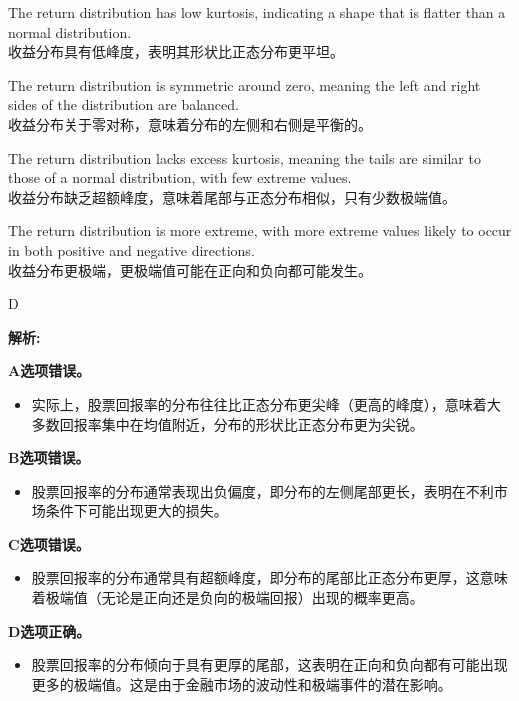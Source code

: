 \documentclass{article}
\newenvironment{explanation}
{\textbf{解析:}\par}
{\par}
\begin{document}
\begin{choices}
    \item The return distribution has low kurtosis, indicating a shape that is flatter than a normal distribution.\\
    收益分布具有低峰度，表明其形状比正态分布更平坦。
    \item The return distribution is symmetric around zero, meaning the left and right sides of the distribution are balanced.\\
    收益分布关于零对称，意味着分布的左侧和右侧是平衡的。
    \item The return distribution lacks excess kurtosis, meaning the tails are similar to those of a normal distribution, with few extreme values.\\
    收益分布缺乏超额峰度，意味着尾部与正态分布相似，只有少数极端值。
    \item The return distribution is more extreme, with more extreme values likely to occur in both positive and negative directions.\\
    收益分布更极端，更极端值可能在正向和负向都可能发生。
\end{choices}

\begin{correctanswer}
    D
\end{correctanswer}

\begin{explanation}
    \textbf{A选项错误。}
    \begin{itemize}
        \item 实际上，股票回报率的分布往往比正态分布更尖峰（更高的峰度），意味着大多数回报率集中在均值附近，分布的形状比正态分布更为尖锐。
    \end{itemize}

    \textbf{B选项错误。}
    \begin{itemize}
        \item 股票回报率的分布通常表现出负偏度，即分布的左侧尾部更长，表明在不利市场条件下可能出现更大的损失。
    \end{itemize}

    \textbf{C选项错误。}
    \begin{itemize}
        \item 股票回报率的分布通常具有超额峰度，即分布的尾部比正态分布更厚，这意味着极端值（无论是正向还是负向的极端回报）出现的概率更高。
    \end{itemize}

    \textbf{D选项正确。}
    \begin{itemize}
        \item 股票回报率的分布倾向于具有更厚的尾部，这表明在正向和负向都有可能出现更多的极端值。这是由于金融市场的波动性和极端事件的潜在影响。
    \end{itemize}
\end{explanation}
\end{document}
